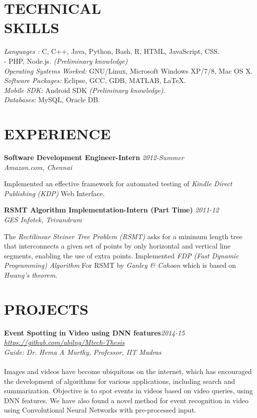 \documentclass[line, margin]{res}
\begin{document}
\begin{resume}
  \section{TECHNICAL \\ SKILLS}
  \textit{Languages :} C, C++, Java, Python, Bash, R, HTML, JavaScript, CSS.\\
  -\hspace{15 mm} PHP, Node.js. \textit{(Preliminary knowledge)}\\
  \textit{Operating Systems Worked:} GNU/Linux, Microsoft Windows XP/7/8, Mac OS X.\\
  \textit{Software Packages:} Eclipse, GCC, GDB, MATLAB, \LaTeX{}.\\
  \textit{Mobile SDK:} Android SDK \textit{(Preliminary knowledge)}.\\
  \textit{Databases:} MySQL, Oracle DB.

  \section{EXPERIENCE}
  \textbf{ Software Development Engineer-Intern }\hfill \textit{2012-Summer } \\
  \textit{Amazon.com, Chennai }

  Implemented an effective framework for automated testing of \textit{Kindle Direct Publishing (KDP)} Web Interface.

  \textbf{ RSMT Algorithm Implementation-Intern (Part Time) }\hfill\textit{2011-12} \\
  \textit{GES Infotek, Trivandrum }

  The \textit{Rectilinear Steiner Tree Problem (RSMT)} asks for a minimum length tree that interconnects a given set of points by only horizontal and vertical line segments, enabling the use of extra points. Implemented \textit{FDP (Fast Dynamic Programming) Algorithm } For RSMT by \textit{Ganley \& Cohoon } which is based on \textit{Hwang’s theorem}.\\

  \pagebreak
  \section{PROJECTS}
  
  \textbf{Event Spotting in Video using DNN features}\hfill \textit{2014-15}\\
  \textit{\url{https://github.com/abilng/Mtech-Thesis}}\\
  \textit{Guide: Dr. Hema A Murthy, Professor, IIT Madras}\\\\
  Images and videos have become ubiquitous on the internet, which has encouraged the development of algorithms for various applications, including search and summarization. Objective is to spot events in videos based on video queries, using DNN features. We have also found a novel method for event recognition in video using Convolutional Neural Networks with pre-processed input.\\


\end{resume}
\end{document}
